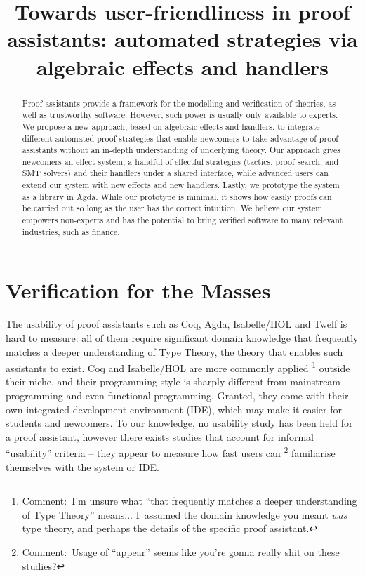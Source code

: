 \documentclass[sigconfl]{acmart}
\newcommand{\comment}[1]{\footnote{Comment:~#1}}
\begin{document}
\title[Towards user-friendliness in proof assistants]{Towards user-friendliness
  in proof assistants: automated strategies \textbf{via} algebraic effects and handlers}



\begin{abstract}
Proof assistants provide a framework for the modelling and verification of
theories, as well as trustworthy software. However, such power is usually only
available to experts. We propose a new approach, based on algebraic effects and
handlers, to integrate different automated proof strategies that enable
newcomers to take advantage of proof assistants without an in-depth
understanding of underlying theory. Our approach gives newcomers an effect
system, a handful of effectful strategies (tactics, proof search, and SMT
solvers) and their handlers under a shared interface, while advanced users can
extend our system with new effects and new handlers. Lastly, we prototype the
system as a library in Agda. While our prototype is minimal, it shows how easily
proofs can be carried out so long as the user has the correct intuition. We
believe our system empowers non-experts and has the potential to bring verified
software to many relevant industries, such as finance.
\end{abstract}


\maketitle

\section{Verification for the Masses}

The usability of proof assistants such as Coq, Agda, Isabelle/HOL and Twelf is
hard to measure: all of them require significant domain knowledge that
frequently matches a deeper understanding of Type Theory, the theory that
enables such assistants to exist. Coq and Isabelle/HOL are more commonly applied
\comment{I'm unsure what ``that frequently matches a deeper understanding of
  Type Theory'' means... I~assumed the domain knowledge you meant \emph{was}
  type theory, and perhaps the details of the specific proof assistant.}
outside their niche, and their programming style is sharply different from
mainstream programming and even functional programming. Granted, they come with
their own integrated development environment (IDE), which may make it easier for
students and newcomers. To our knowledge, no usability study has been
held for a proof assistant, however there exists studies that account for
informal ``usability'' criteria -- they appear to measure how fast users can
\comment{Usage of ``appear'' seems like you're gonna really shit on these studies?}
familiarise themselves with the system or IDE.
\end{document}
